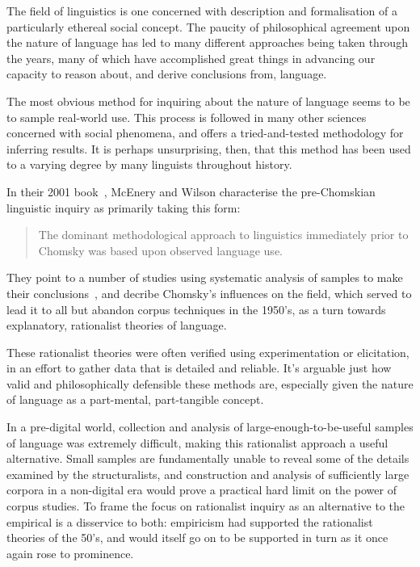 

The field of linguistics is one concerned with description and formalisation of a particularly ethereal social concept.  The paucity of philosophical agreement upon the nature of language has led to many different approaches being taken through the years, many of which have accomplished great things in advancing our capacity to reason about, and derive conclusions from, language.


The most obvious method for inquiring about the nature of language seems to be to sample real-world use.  This process is followed in many other sciences concerned with social phenomena, and offers a tried-and-tested methodology for inferring results.  It is perhaps unsurprising, then, that this method has been used to a varying degree by many linguists throughout history.

In their 2001 book~\cite{macenery2001corpus}, McEnery and Wilson characterise the pre-Chomskian linguistic inquiry as primarily taking this form:

\begin{quote}
The dominant methodological approach to linguistics immediately prior to Chomsky was based upon observed language use.
\end{quote}

They point to a number of studies using systematic analysis of samples to make their conclusions~\cite{kaeding1897haufigkeitsworterbuch,preyer1889mind,stern1924psychology,eaton1940semantic,west1953general}, and decribe Chomsky's influences on the field, which served to lead it to all but abandon corpus techniques in the 1950's, as a turn towards explanatory, rationalist theories of language.

These rationalist theories were often verified using experimentation or elicitation, in an effort to gather data that is detailed and reliable.  It's arguable just how valid and philosophically defensible these methods are, especially given the nature of language as a part-mental, part-tangible concept.%



In a pre-digital world, collection and analysis of large-enough-to-be-useful samples of language was extremely difficult, making this rationalist approach a useful alternative.
Small samples are fundamentally unable to reveal some of the details examined by the structuralists, and construction and analysis of sufficiently large corpora in a non-digital era would prove a practical hard limit on the power of corpus studies.  To frame the focus on rationalist inquiry as an alternative to the empirical is a disservice to both: empiricism had supported the rationalist theories of the 50's, and would itself go on to be supported in turn as it once again rose to prominence.

